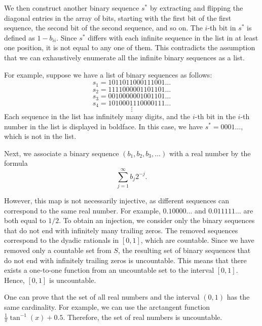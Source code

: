 We then construct another binary sequence $s^{*}$ by extracting and flipping the diagonal entries in the array of bits, starting with the first bit of the first sequence, the second bit of the second sequence, and so on. The $i$-th bit in $s^{*}$ is defined as $1-b_{ii}$. Since $s^{*}$ differs with each infinite sequence in the list in at least one position, it is not equal to any one of them. This contradicts the assumption that we can exhaustively enumerate all the infinite binary sequences as a list.

For example, suppose we have a list of binary sequences as follows:
\[
s_1 = 1011011000111001\ldots
\]
\[
s_2 = 1111000001101101\ldots
\]
\[
s_3 = 0010000001001101\ldots
\]
\[
s_4 = 1010001110000111\ldots
\]
\[
\vdots
\]
Each sequence in the list has infinitely many digits, and the $i$-th bit in the $i$-th number in the list is displayed in boldface. In this case, we have $s^{*}=0001\ldots$, which is not in the list.

Next, we associate a binary sequence $(b_1,b_2,b_3,\ldots)$ with a real number by the formula
\[
\sum_{j=1}^{\infty} b_j 2^{-j}.
\]

However, this map is not necessarily injective, as different sequences can correspond to the same real number. For example, $0.10000\ldots$ and $0.011111\ldots$ are both equal to $1/2$. To obtain an injection, we consider only the binary sequences that do not end with infinitely many trailing zeros. The removed sequences correspond to the dyadic rationals in $[0,1]$, which are countable. Since we have removed only a countable set from $S$, the resulting set of binary sequences that do not end with infinitely trailing zeros is uncountable. This means that there exists a one-to-one function from an uncountable set to the interval $[0,1]$. Hence, $[0,1]$ is uncountable.

One can prove that the set of all real numbers and the interval $(0,1)$ has the same cardinality. For example, we can use the arctangent function $\frac{1}{\pi}\tan^{-1}(x)+0.5$. Therefore, the set of real numbers is uncountable.
